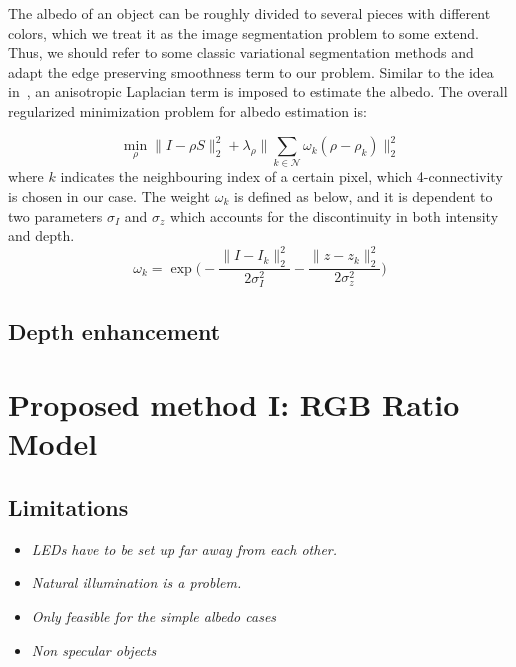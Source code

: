 The albedo of an object can be roughly divided to several pieces with different colors, which we treat it as the image segmentation problem to some extend. 
Thus, we should refer to some classic variational segmentation methods and adapt the edge preserving smoothness term to our problem.
Similar to the idea in~\cite{casaca2014laplacian}, an anisotropic Laplacian term is imposed to estimate the albedo.
The overall regularized minimization problem for albedo estimation is:

\begin{equation}
	\min_{\rho} \lVert I - \rho S\rVert^2_2 + \lambda_{\rho} \lVert \sum_{k \in \mathcal{N}} \omega_k (\rho - \rho_k) \rVert^2_2
\end{equation}
where $k$ indicates the neighbouring index of a certain pixel, which 4-connectivity is chosen in our case. 
The weight $\omega_k$ is defined as below, and it is dependent to two parameters $\sigma_I$ and $\sigma_z$ which accounts for the discontinuity in both intensity and depth.
\begin{equation}
	\omega_k=\exp\Bigg(-\dfrac{\lVert I - I_k \rVert^2_2}{2\sigma_I^2} -\dfrac{\lVert z - z_k \rVert^2_2}{2\sigma_z^2}\Bigg)
\end{equation}

\subsection{Depth enhancement}


\section{Proposed method I: RGB Ratio Model}



\subsection{Limitations}
\begin{itemize}
\item \emph{LEDs have to be set up far away from each other.}
\item \emph{Natural illumination is a problem.}
\item \emph{Only feasible for the simple albedo cases}
\item \emph{Non specular objects}
\end{itemize}


